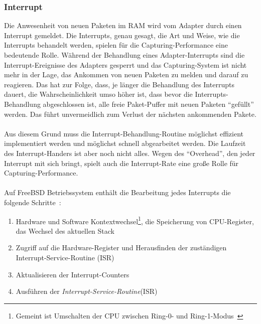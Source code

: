 {\subsubsection*{Interrupt}\label{sec:hw_intr}
Die Anwesenheit von neuen Paketen im RAM wird vom Adapter durch einen Interrupt
gemeldet.  Die Interrupts, genau gesagt, die Art und Weise, wie die Interrupts
behandelt werden, spielen für die Capturing-Performance eine bedeutende Rolle.
Während der Behandlung eines Adapter-Interrupts sind die Interrupt-Ereignisse
des Adapters gesperrt und das Capturing-System ist nicht mehr in der Lage, das
Ankommen von neuen Paketen zu melden und darauf zu reagieren. Das hat zur
Folge, dass, je länger die Behandlung des Interrupts dauert, die
Wahrscheinlichkeit umso höher ist, dass bevor die Interrupts-Behandlung
abgeschlossen ist, alle freie Paket-Puffer mit neuen Paketen ``gefüllt''
werden. Das führt unvermeidlich zum Verlust der nächsten ankommenden
Pakete.\\\\ 
%
Aus diesem Grund muss die Interrupt-Behandlung-Routine möglichst effizient
implementiert werden und möglichst schnell abgearbeitet werden.
Die Laufzeit des Interrupt-Handers ist aber noch nicht alles. Wegen des ``Overhead'', den jeder
Interrupt mit sich bringt, spielt auch die Interrupt-Rate eine große Rolle für
Capturing-Performance.\\\\
%
Auf FreeBSD Betriebssystem enthält die Bearbeitung jedes Interrupts 
die folgende Schritte~\cite{freebsd_design}:
\begin{enumerate}
	\item Hardware und Software Kontextwechsel\footnote{Gemeint ist Umschalten der CPU zwischen Ring-0- und Ring-1-Modus~\cite{pchw} }, die Speicherung von
		CPU-Register, das Wechsel des aktuellen Stack
	\item Zugriff auf die Hardware-Register und Herausfinden der zuständigen
		Interrupt-Service-Routine (ISR)
	\item Aktualisieren der Interrupt-Counters
	\item Ausführen der \emph{Interrupt-Service-Routine}(ISR)
\end{enumerate}
}
